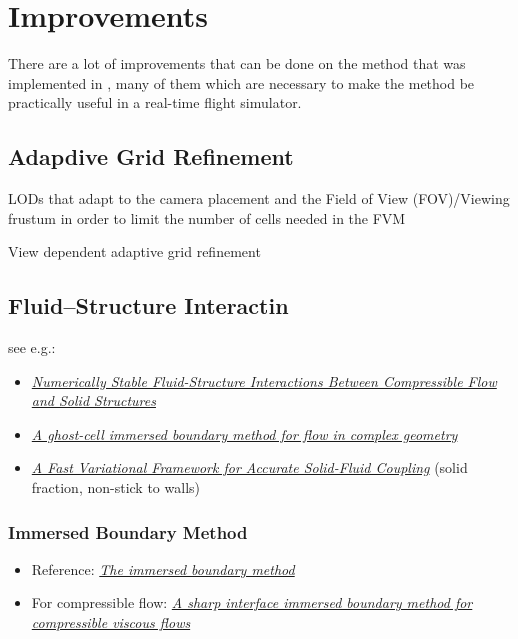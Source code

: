 \chapter{Improvements}

There are a lot of improvements that can be done on the method that was implemented in \thisprojectwork, many of them which are necessary  to make the method be practically useful in a real-time flight simulator.

\section{Adapdive Grid Refinement}

LODs that adapt to the camera placement and the Field of View (FOV)/Viewing frustum in order to limit the number of cells needed in the FVM

View dependent adaptive grid refinement

\section{Fluid--Structure Interactin}

see e.g.:

\begin{itemize}
    \item \textit{\href{http://physbam.stanford.edu/~fedkiw/papers/stanford2010-04.pdf}{Numerically Stable Fluid-Structure Interactions Between Compressible Flow and Solid Structures}}
    \item \textit{\href{http://efdl.as.ntu.edu.tw/research/papers/JCP03GCIBM.pdf}{A ghost-cell immersed boundary method for flow in complex geometry}}
    \item \textit{\href{http://www.cs.columbia.edu/~batty/papers/Batty07.pdf}{A Fast Variational Framework for Accurate Solid-Fluid Coupling}} (solid fraction, non-stick to walls)
\end{itemize}

\subsection{Immersed Boundary Method}

\begin{itemize}
    \item Reference: \textit{\href{http://www4.ncsu.edu/~zhilin/TEACHING/MA798Z/Peskin1.pdf}{The immersed boundary method}}
    \item For compressible flow: \textit{\href{http://www.cecs.wright.edu/~haibo.dong/wp-content/themes/publications/IBM_JCP_2007.pdf}{A sharp interface immersed boundary method for compressible viscous flows}}
\end{itemize}

